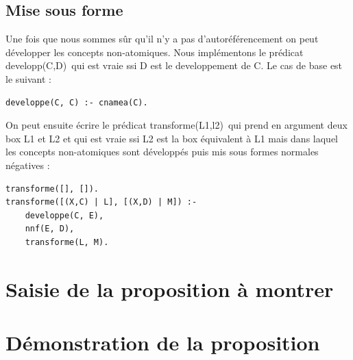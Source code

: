 \documentclass[12pt]{article}
\begin{document}
\subsection{Mise sous forme}
Une fois que nous sommes sûr qu'il n'y a pas d'autoréférencement on peut développer les concepts non-atomiques. Nous implémentons le prédicat \color{blue}developp(C,D)\color{black}\ qui est vraie ssi D est le developpement de C. Le cas de base est le suivant : 
\begin{verbatim}
developpe(C, C) :- cnamea(C).
\end{verbatim}
On peut ensuite écrire le prédicat \color{blue}transforme(L1,l2)\color{black}\ qui prend en argument deux box L1 et L2 et qui est vraie ssi L2 est la box équivalent à L1 mais dans laquel les concepts non-atomiques sont développés puis mis sous formes normales négatives :
\begin{verbatim}
transforme([], []).
transforme([(X,C) | L], [(X,D) | M]) :- 
	developpe(C, E),
	nnf(E, D),
	transforme(L, M).
\end{verbatim}
\section{Saisie de la proposition à montrer}
\section{Démonstration de la proposition}
\end{document}
